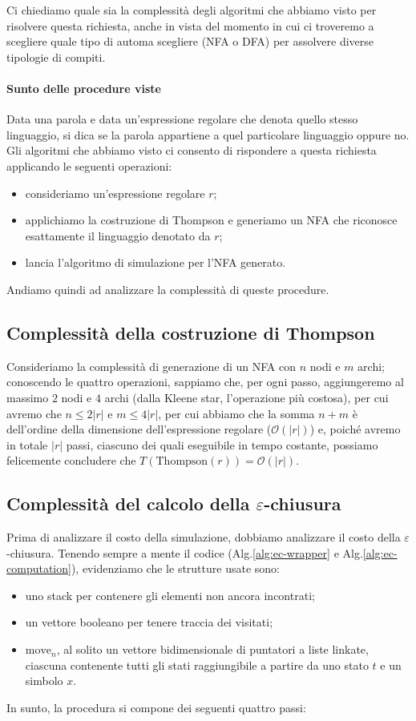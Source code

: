 \documentclass[class=book, crop=false, oneside, 12pt]{standalone}
\begin{document}
Ci chiediamo quale sia la complessità degli algoritmi che abbiamo visto per risolvere questa richiesta, anche in vista del momento in cui ci troveremo a scegliere quale tipo di automa scegliere (NFA o DFA) per assolvere diverse tipologie di compiti.

\paragraph{Sunto delle procedure viste}
Data una parola e data un'espressione regolare che denota quello stesso linguaggio, si dica se la parola appartiene a quel particolare linguaggio oppure no. Gli algoritmi che abbiamo visto ci consento di rispondere a questa richiesta applicando le seguenti operazioni:
\begin{itemize}
    \item consideriamo un'espressione regolare \(r\);
    \item applichiamo la costruzione di Thompson e generiamo un NFA che riconosce esattamente il linguaggio denotato da \(r\);
    \item lancia l'algoritmo di simulazione per l'NFA generato.
\end{itemize}
Andiamo quindi ad analizzare la complessità di queste procedure.

\subsection{Complessità della costruzione di Thompson}
Consideriamo la  complessità di generazione di un NFA con \(n\) nodi e \(m\) archi; conoscendo le quattro operazioni, sappiamo che, per ogni passo, aggiungeremo al massimo \(2\) nodi e \(4\) archi (dalla Kleene star, l'operazione più costosa), per cui avremo che \(n \le 2|r|\) e \(m \le 4|r|\), per cui abbiamo che la somma \(n + m\) è dell'ordine della dimensione dell'espressione regolare (\(\mathcal{O}(|r|)\)) e, poiché avremo in totale \(|r|\) passi, ciascuno dei quali eseguibile in tempo costante, possiamo felicemente concludere che \(T(\textrm{Thompson}(r)) = \mathcal{O}(|r|)\).

\subsection{Complessità del calcolo della \(\varepsilon\)-chiusura}
Prima di analizzare il costo della simulazione, dobbiamo analizzare il costo della \(\varepsilon\)-chiusura. Tenendo sempre a mente il codice (Alg.\ref{alg:ec-wrapper} e Alg.\ref{alg:ec-computation}), evidenziamo che le strutture usate sono:
\begin{itemize}
    \item uno stack per contenere gli elementi non ancora incontrati;
    \item un vettore booleano per tenere traccia dei visitati;
    \item \(\textrm{move}_n\), al solito un vettore bidimensionale di puntatori a liste linkate, ciascuna contenente tutti gli stati raggiungibile a partire da uno stato \(t\) e un simbolo \(x\).
\end{itemize} 
In sunto, la procedura si compone dei seguenti quattro passi:
\end{document}
